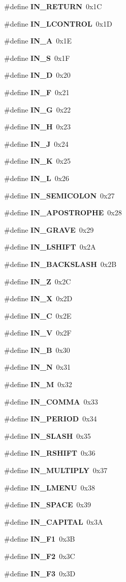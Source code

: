 \begin{CompactItemize}
\#define {\bf IN\_\-RETURN}~0x1C
\item 
\#define {\bf IN\_\-LCONTROL}~0x1D
\item 
\#define {\bf IN\_\-A}~0x1E
\item 
\#define {\bf IN\_\-S}~0x1F
\item 
\#define {\bf IN\_\-D}~0x20
\item 
\#define {\bf IN\_\-F}~0x21
\item 
\#define {\bf IN\_\-G}~0x22
\item 
\#define {\bf IN\_\-H}~0x23
\item 
\#define {\bf IN\_\-J}~0x24
\item 
\#define {\bf IN\_\-K}~0x25
\item 
\#define {\bf IN\_\-L}~0x26
\item 
\#define {\bf IN\_\-SEMICOLON}~0x27
\item 
\#define {\bf IN\_\-APOSTROPHE}~0x28
\item 
\#define {\bf IN\_\-GRAVE}~0x29
\item 
\#define {\bf IN\_\-LSHIFT}~0x2A
\item 
\#define {\bf IN\_\-BACKSLASH}~0x2B
\item 
\#define {\bf IN\_\-Z}~0x2C
\item 
\#define {\bf IN\_\-X}~0x2D
\item 
\#define {\bf IN\_\-C}~0x2E
\item 
\#define {\bf IN\_\-V}~0x2F
\item 
\#define {\bf IN\_\-B}~0x30
\item 
\#define {\bf IN\_\-N}~0x31
\item 
\#define {\bf IN\_\-M}~0x32
\item 
\#define {\bf IN\_\-COMMA}~0x33
\item 
\#define {\bf IN\_\-PERIOD}~0x34
\item 
\#define {\bf IN\_\-SLASH}~0x35
\item 
\#define {\bf IN\_\-RSHIFT}~0x36
\item 
\#define {\bf IN\_\-MULTIPLY}~0x37
\item 
\#define {\bf IN\_\-LMENU}~0x38
\item 
\#define {\bf IN\_\-SPACE}~0x39
\item 
\#define {\bf IN\_\-CAPITAL}~0x3A
\item 
\#define {\bf IN\_\-F1}~0x3B
\item 
\#define {\bf IN\_\-F2}~0x3C
\item 
\#define {\bf IN\_\-F3}~0x3D
\item 

\end{CompactItemize}
